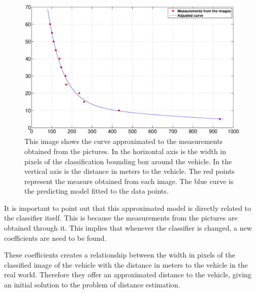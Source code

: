 \begin{figure}[h]
\centering
\includegraphics[width=\linewidth]{img/distance_estimation.eps}
\caption{This image shows the curve approximated to the measurements obtained
from the pictures. In the horizontal axis is the width in pixels of
the classification bounding box around the vehicle. In the vertical axis is the
distance in meters to the vehicle. The red points represent the measure obtained
from each image. The blue curve is the predicting model fitted to the data points.}
\label{fig:distance-curve-fitting}
\end{figure} 

It is important to point out that this approximated model is directly related to
the classifier itself. This is because the measurements from the pictures are
obtained through it. This implies that whenever the classifier is changed, a new
coefficients are need to be found.

These coefficients creates a relationship between the width in pixels
of the classified image of the vehicle with the distance in meters to the
vehicle in the real world. Therefore they offer an approximated distance to the
vehicle, giving an initial solution to the problem of distance estimation.


